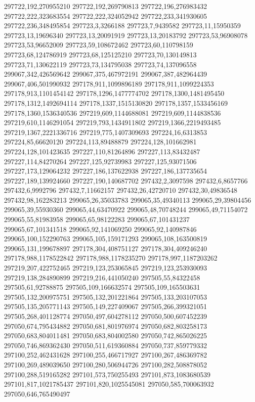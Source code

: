 297722,192,270955210
297722,192,269790813
297722,196,276983432
297722,222,323683554
297722,222,324052942
297722,233,341930605
297722,236,348495854
297723,3,3266188
297723,7,9439582
297723,11,15950359
297723,13,19696340
297723,13,20091919
297723,13,20183792
297723,53,96908078
297723,53,96652009
297723,59,108672462
297723,60,110798159
297723,68,124786919
297723,68,125125210
297723,70,130149813
297723,71,130622119
297723,73,134795038
297723,74,137096558
299067,342,426569642
299067,375,467972191
299067,387,482964439
299067,406,501990932
297178,911,1099896189
297178,911,1099224353
297178,913,1101454142
297178,1296,1477774702
297178,1300,1481495450
297178,1312,1492694114
297178,1337,1515130820
297178,1357,1533456169
297178,1360,1536340536
297219,609,1144688081
297219,609,1144838536
297219,610,1146291054
297219,793,1434911802
297219,1366,2219493485
297219,1367,2221336716
297219,775,1407309693
297224,16,6313853
297224,85,66620120
297224,113,89488879
297224,128,101662981
297224,128,101423635
297227,110,81264896
297227,113,83432487
297227,114,84270264
297227,125,92739983
297227,125,93071506
297227,173,129064232
297227,186,137622938
297227,186,137735654
297227,189,139924660
297227,190,140687702
297432,2,3097598
297432,6,8657766
297432,6,9992796
297432,7,11662157
297432,26,42720710
297432,30,49836548
297432,98,162283213
299065,26,35033783
299065,35,49340113
299065,29,39804456
299065,39,55930360
299065,44,63470922
299065,48,70748244
299065,49,71154072
299065,55,81983958
299065,65,98122283
299065,67,101431237
299065,67,101341518
299065,92,141069250
299065,92,140987846
299065,100,152290763
299065,105,159171293
299065,108,163500819
299065,131,199678897
297178,304,408751127
297178,304,409246240
297178,988,1178522842
297178,988,1178235270
297178,997,1187203262
297219,207,422752465
297219,123,253065845
297219,123,253930093
297219,138,284890899
297219,216,441050240
297505,55,84322458
297505,61,92788875
297505,109,166632574
297505,109,165503631
297505,132,200975751
297505,132,201221864
297505,133,203107053
297505,135,205771143
297505,149,227409067
297505,266,399321051
297505,268,401128774
297050,497,604278112
297050,500,607452239
297050,674,795434882
297050,681,801976974
297050,682,803258173
297050,683,804011481
297050,683,804002580
297050,742,865026225
297050,746,869362430
297050,511,619360884
297050,737,859779332
297100,252,462431628
297100,255,466717927
297100,267,486369782
297100,269,489039650
297100,280,506944726
297100,282,508878052
297100,288,519165282
297101,573,750255493
297101,873,1083680539
297101,817,1021785437
297101,820,1025545081
297050,585,700063932
297050,646,765490497
